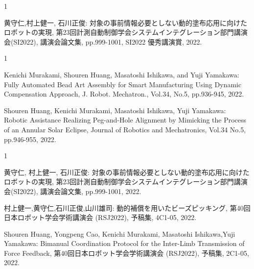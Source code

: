 \begin{受賞}{1}

黄守仁,村上健一, 石川正俊: 対象の事前情報必要としない動的塗布応用に向けたロボットの実現, 第23回計測自動制御学会システムインテグレーション部門講演会(SI2022), 講演会論文集, pp.999-1001, SI2022 優秀講演賞, 2022.

\end{受賞}

\begin{雑誌論文}{1}

Kenichi Murakami, Shouren Huang, Masatoshi Ishikawa, and Yuji Yamakawa: Fully Automated Bead Art Assembly for Smart Manufacturing Using Dynamic Compensation Approach, J. Robot. Mechatron., Vol.34, No.5, pp.936-945, 2022. 

Shouren Huang, Kenichi Murakami, Masatoshi Ishikawa, Yuji Yamakawa: Robotic Assistance Realizing Peg-and-Hole Alignment by Mimicking the Process of an Annular Solar Eclipse, Journal of Robotics and Mechatronics, Vol.34 No.5, pp.946-955, 2022. 

\end{雑誌論文}

\begin{発表}{1}

黄守仁, 村上健一, 石川正俊: 対象の事前情報必要としない動的塗布応用に向けたロボットの実現, 第23回計測自動制御学会システムインテグレーション部門講演会(SI2022), 講演会論文集, pp.999-1001, 2022.

村上健一,黄守仁,石川正俊,山川雄司: 動的補償を用いたビーズピッキング, 第40回日本ロボット学会学術講演会 (RSJ2022), 予稿集, 4C1-05, 2022.

Shouren Huang, Yongpeng Cao, Kenichi Murakami, Masatoshi Ishikawa,Yuji Yamakawa: Bimanual Coordination Protocol for the Inter-Limb Transmission of Force Feedback, 第40回日本ロボット学会学術講演会 (RSJ2022), 予稿集, 2C1-05, 2022.

\end{発表}
